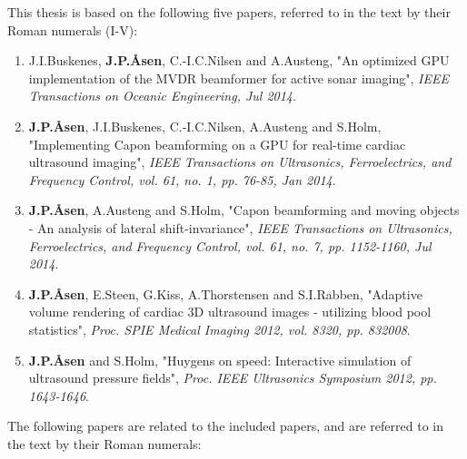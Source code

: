 \documentclass[10pt,b5paper,twoside]{book}
\begin{document}
This thesis is based on the following five papers, referred to in the text by their Roman numerals (I-V): 
\begin{enumerate}[I]
\renewcommand\labelenumi{\bfseries\theenumi}
	\item J.\:I.\:Buskenes, \textbf{J.\:P.\:\AA{}sen}, C.-I.\:C.\:Nilsen and A.\:Austeng, "An optimized GPU implementation of the MVDR beamformer for active sonar imaging", {\it  IEEE Transactions on Oceanic Engineering, Jul 2014}.
	\item \textbf{J.\:P.\:\AA{}sen}, J.\:I.\:Buskenes, C.-I.\:C.\:Nilsen, A.\:Austeng and S.\:Holm, "Implementing Capon beamforming on a GPU for real-time cardiac ultrasound imaging", {\it IEEE Transactions on Ultrasonics, Ferroelectrics, and Frequency Control, vol. 61, no. 1, pp. 76-85, Jan 2014}.
 	\item \textbf{J.\:P.\:\AA{}sen}, A.\:Austeng and S.\:Holm, "Capon beamforming and moving objects - An analysis of lateral shift-invariance", {\it IEEE Transactions on Ultrasonics, Ferroelectrics, and Frequency Control, vol. 61, no. 7, pp. 1152-1160, Jul 2014}.
	\item \textbf{J.\:P.\:\AA{}sen}, E.\:Steen, G.\:Kiss, A.\:Thorstensen and S.\:I.\:Rabben, "Adaptive volume rendering of cardiac 3D ultrasound images - utilizing blood pool statistics", {\it Proc. SPIE Medical Imaging 2012, vol. 8320, pp. 832008}.
	\item \textbf{J.\:P.\:\AA{}sen} and S.\:Holm, "Huygens on speed: Interactive simulation of ultrasound pressure fields", {\it Proc. IEEE Ultrasonics Symposium 2012, pp. 1643-1646}.
\end{enumerate}  

The following papers are related to the included papers, and are referred to in the text by their Roman numerals: 
\end{document}
